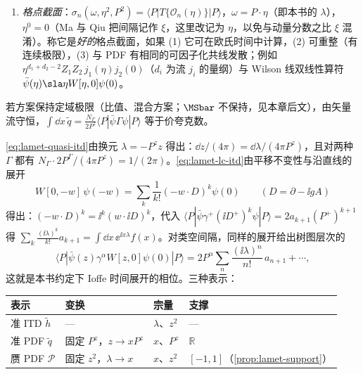 \begin{definition}
\begin{enumerate}[label=(\roman*),leftmargin=2em,itemsep=1pt,topsep=2pt]
其中 $w=(0^+,w^-,\mathbf 0_{\mathrm T})$，$\lambda=P^+w^-$。
\item \emph{格点截面}\cite{MaQiu2018}：$\sigma_n(\omega,\eta^2,P^2)=\langle P|T\{\mathcal O_n(\eta)\}|P\rangle$，$\omega=P\cdot\eta$（即本书的 $\lambda$），$\eta^0=0$（Ma 与 Qiu 把间隔记作 $\xi$，这里改记为 $\eta$，以免与动量分数之比 $\xi$ 混淆）。称它是\emph{好的}格点截面，如果 (1) 它可在欧氏时间中计算，(2) 可重整（有连续极限），(3) 与 PDF 有相同的可因子化共线发散；例如 $\eta^{d_1+d_2-2}Z_1Z_2\,j_1(\eta)j_2(0)$（$d_i$ 为流 $j_i$ 的量纲）与 Wilson 线双线性算符 $\bar\psi(\eta)\sla\eta W[\eta,0]\psi(0)$。
\end{enumerate}
若方案保持定域极限（比值、混合方案；$\MSbar$ 不保持，见本章后文），由矢量流守恒，$\int\dd x\,\tilde q=\frac{N_\Gamma}{2P^z}\langle P|\bar\psi\Gamma\psi|P\rangle$ 等于价夸克数。
\end{definition}

\cref{eq:lamet-quasi-itd}由换元 $\lambda=-P^zz$ 得出：$\dd z/(4\pi)=\dd\lambda/(4\pi P^z)$，且对两种 $\Gamma$ 都有 $N_\Gamma\cdot2P^\Gamma/(4\pi P^z)=1/(2\pi)$。\cref{eq:lamet-lc-itd}由平移不变性与沿直线的展开
\[
W[0,-w]\,\psi(-w)=\sum_k\frac1{k!}(-w\cdot D)^k\psi(0)\qquad(D=\partial-\ii gA)
\]
得出：$(-w\cdot D)^k=\ii^k(w\cdot\ii D)^k$，代入 $\langle P|\bar\psi\gamma^+(\ii D^+)^k\psi|P\rangle=2a_{k+1}(P^+)^{k+1}$ 得 $\sum_k\frac{(\ii\lambda)^k}{k!}a_{k+1}=\int\dd x\,\ee^{\ii x\lambda}f(x)$。对类空间隔，同样的展开给出树图层次的
\[
\langle P|\bar\psi(z)\gamma^\alpha W[z,0]\psi(0)|P\rangle=2P^\alpha\sum_n\frac{(\ii\lambda)^n}{n!}\,a_{n+1}+\cdots,
\]
这就是本书约定下 Ioffe 时间展开的相位。三种表示：
\begin{center}
\small
\begin{tabular}{@{}llll@{}}
\toprule
表示 & 变换 & 宗量 & 支撑 \\
\midrule
准 ITD $\tilde h$ & — & $\lambda$、$z^2$ & — \\
准 PDF $\tilde q$ & 固定 $P^z$，$z\to xP^z$ & $x$、$P^z$ & $\mathbb R$ \\
赝 PDF $\mathcal P$ & 固定 $z^2$，$\lambda\to x$ & $x$、$z^2$ & $[-1,1]$（\cref{prop:lamet-support}） \\
\bottomrule
\end{tabular}
\end{center}

